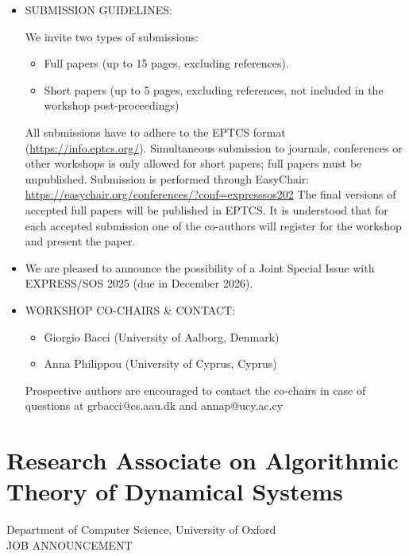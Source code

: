 \documentclass[prodmode,acmtecs]{acmsmall} %
\begin{document}
\begin{itemize}
\item  SUBMISSION GUIDELINES: 
 
  We invite two types of submissions: 
 
\begin{itemize}\item  Full papers (up to 15 pages, excluding references).
\item  Short papers (up to 5 pages, excluding references, not included in the workshop post-proceedings)
\end{itemize} 
  All submissions have to adhere to the EPTCS format (\href{https://info.eptcs.org/}{https://info.eptcs.org/}). Simultaneous submission to journals, conferences or other workshops is only allowed for short papers; full papers must be unpublished. Submission is performed through EasyChair: \href{https://easychair.org/conferences/?conf=expresssos202}{https://easychair.org/conferences/?conf=expresssos202} The final versions of accepted full papers will be published in EPTCS. It is understood that for each accepted submission one of the co-authors will register for the workshop and present the paper.  
 
\item  We are pleased to announce the possibility of a Joint Special Issue with EXPRESS/SOS 2025 (due in December 2026). 
 
\item  WORKSHOP CO-CHAIRS \& CONTACT: 
 
\begin{itemize}\item  Giorgio Bacci (University of Aalborg, Denmark)
\item  Anna Philippou (University of Cyprus, Cyprus)
\end{itemize} 
  Prospective authors are encouraged to contact the co-chairs in case of questions at grbacci@cs.aau.dk and annap@ucy.ac.cy 
 
\end{itemize}\section{Research Associate on Algorithmic Theory of Dynamical Systems}\label{ResearchAssociateonAlgorithmicTheoryofDynamicalSystems}  Department of Computer Science, University of Oxford\\ 
JOB ANNOUNCEMENT 
\end{document}
